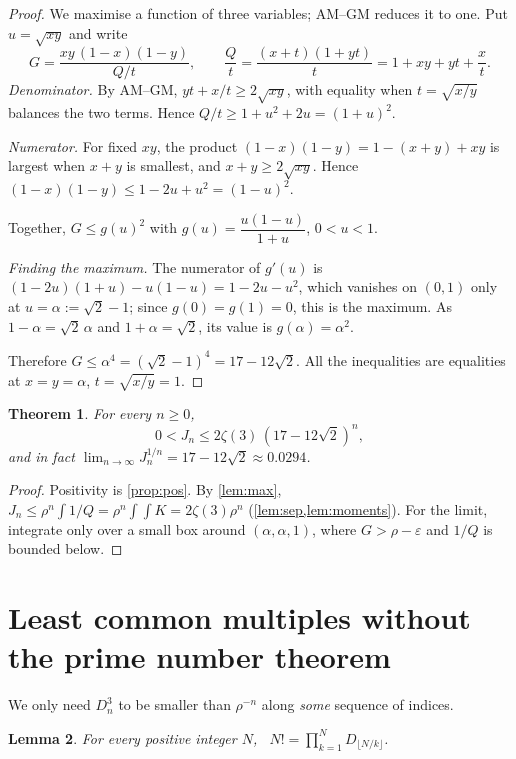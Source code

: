 \documentclass[11pt]{article}
\newcommand{\Dn}{D_n}
\theoremstyle{plain}
\newtheorem{theorem}{Theorem}[section]
\newtheorem{lemma}[theorem]{Lemma}
\theoremstyle{definition}
\theoremstyle{remark}
\begin{document}
\begin{proof}
We maximise a function of three variables; AM--GM reduces it to one. Put $u=\sqrt{xy}$ and write
\[
  G=\frac{xy\,(1-x)(1-y)}{Q/t},\qquad \frac Qt=\frac{(x+t)(1+yt)}t=1+xy+yt+\frac xt .
\]
\emph{Denominator.} By AM--GM, $yt+x/t\ge2\sqrt{xy}$, with equality when $t=\sqrt{x/y}$ balances
the two terms. Hence $Q/t\ge1+u^2+2u=(1+u)^2$.

\emph{Numerator.} For fixed $xy$, the product $(1-x)(1-y)=1-(x+y)+xy$ is largest when $x+y$ is
smallest, and $x+y\ge2\sqrt{xy}$. Hence $(1-x)(1-y)\le1-2u+u^2=(1-u)^2$.

Together, $G\le g(u)^2$ with $g(u)=\dfrac{u(1-u)}{1+u}$, $0<u<1$.

\emph{Finding the maximum.} The numerator of $g'(u)$ is $(1-2u)(1+u)-u(1-u)=1-2u-u^2$, which
vanishes on $(0,1)$ only at $u=\alpha:=\sqrt2-1$; since $g(0)=g(1)=0$, this is the maximum. As
$1-\alpha=\sqrt2\,\alpha$ and $1+\alpha=\sqrt2$, its value is $g(\alpha)=\alpha^2$.

Therefore $G\le\alpha^4=(\sqrt2-1)^4=17-12\sqrt2$. All the
inequalities are equalities at $x=y=\alpha$, $t=\sqrt{x/y}=1$.
\end{proof}

\begin{theorem}\label{thm:decay}
For every $n\ge0$,
\[
  0<J_n\le2\zeta(3)\,(17-12\sqrt2)^n ,
\]
and in fact $\lim_{n\to\infty}J_n^{1/n}=17-12\sqrt2\approx0.0294$.
\end{theorem}

\begin{proof}
Positivity is \cref{prop:pos}. By \cref{lem:max}, $J_n\le\rho^n\int1/Q=\rho^n\int\!\!\int K=2\zeta(3)\rho^n$
(\cref{lem:sep,lem:moments}). For the limit, integrate only over a small box around
$(\alpha,\alpha,1)$, where $G>\rho-\varepsilon$ and $1/Q$ is bounded below.
\end{proof}

\section{Least common multiples without the prime number theorem}\label{sec:lcm}

We only need $\Dn^3$ to be smaller than $\rho^{-n}$ along \emph{some} sequence of indices.

\begin{lemma}\label{lem:factorial}
For every positive integer $N$, \ $N!=\prod_{k=1}^ND_{\lfloor N/k\rfloor}$.
\end{lemma}
\end{document}
